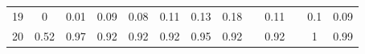 \documentclass[twoside,11pt]{article}
\begin{document}
\begin{table}[H]
{\begin{tabular}{cccccccclclcc}
\multicolumn{1}{|c|}{19}                                                                          & \multicolumn{1}{c|}{0}                                                              & \multicolumn{1}{c|}{0.01}                                                                      & \multicolumn{1}{c|}{0.09}                                                                & \multicolumn{1}{c|}{0.08}                                                                & \multicolumn{1}{c|}{0.11}                                                                & \multicolumn{1}{c|}{\cellcolor[HTML]{ECF4FF}0.13}                                           & \multicolumn{1}{c|}{\cellcolor[HTML]{FFCCC9}0.18}                                           & \multicolumn{1}{l|}{}                                                                          & \multicolumn{1}{c|}{0.11}                                                                   & \multicolumn{1}{l|}{}                    & \multicolumn{1}{c|}{0.1}                                                                       & \multicolumn{1}{c|}{0.09}                                                                      \\ \cline{1-1}
\multicolumn{1}{|c|}{20}                                                                          & \multicolumn{1}{c|}{0.52}                                                           & \multicolumn{1}{c|}{\cellcolor[HTML]{FFCCC9}0.97}                                              & \multicolumn{1}{c|}{0.92}                                                                & \multicolumn{1}{c|}{0.92}                                                                & \multicolumn{1}{c|}{0.92}                                                                & \multicolumn{1}{c|}{\cellcolor[HTML]{ECF4FF}0.95}                                           & \multicolumn{1}{c|}{0.92}                                                                   & \multicolumn{1}{l|}{}                                                                          & \multicolumn{1}{c|}{0.92}                                                                   & \multicolumn{1}{l|}{}                    & \multicolumn{1}{c|}{1}                                                                         & \multicolumn{1}{c|}{0.99}                                                                      \\ \cline{1-10} \cline{12-13} 

\end{tabular}}
\end{table}
\end{document}
